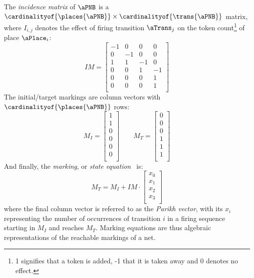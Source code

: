 The \emph{incidence matrix} of $\aPNB$ is a $\cardinalityof{\places{\aPNB}}
\times \cardinalityof{\trans{\aPNB}}$ matrix, where $I_{i, j}$ denotes the
effect of firing transition $\aTrans_j$ on the token count\footnote{1 signifies
that a token is added, -1 that it is taken away and 0 denotes no effect.} of
place $\aPlace_i$:
\[
    IM =
\begin{bmatrix}
    -1 &  0 &  0 &  0\\
     0 & -1 &  0 &  0\\
     1 &  1 & -1 &  0\\
     0 &  0 &  1 & -1\\
     0 &  0 &  0 &  1\\
     0 &  0 &  0 &  1\\
\end{bmatrix}
\]
The initial/target markings are column vectors with
$\cardinalityof{\places{\aPNB}}$ rows:
\[
    M_I =
\begin{bmatrix}
    1\\
    1\\
    0\\
    0\\
    0\\
    0\\
\end{bmatrix}
\qquad
    M_T =
\begin{bmatrix}
    0\\
    0\\
    0\\
    1\\
    1\\
    1\\
\end{bmatrix}
\]
And finally, the \emph{marking}, or \emph{state equation}~\cite{Murata1989} is:
\begin{equation}\label{eqn:marking}
    M_T = M_I + IM \cdot
\begin{bmatrix}
    x_0\\
    x_1\\
    x_2\\
    x_3\\
\end{bmatrix}
\end{equation}
where the final column vector is referred to as the \emph{Parikh vector}, with
its $x_i$ representing the number of occurrences of transition $i$ in a firing
sequence starting in $M_I$ and reaches $M_T$. Marking equations are thus
algebraic representations of the reachable markings of a net.

